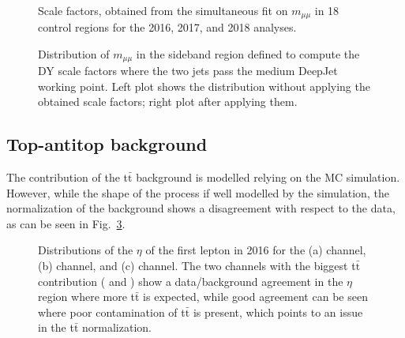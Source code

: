 \documentclass[../main.tex]{subfiles}
\begin{document}
\begin{figure}[h!]
\begin{center}
\\
\end{center}
\caption{Scale factors, obtained from the simultaneous fit on $m_{\mu\mu}$ in 18 control regions for the 2016, 2017, and 2018 analyses.}
\label{hh:fig:dy_sf}
\end{figure}

\begin{figure}[h!]
\begin{center}
\end{center}
\caption{Distribution of $m_{\mu\mu}$ in the sideband region defined to compute the DY scale factors where the two jets pass the medium DeepJet working point. Left plot shows the distribution without applying the obtained scale factors; right plot after applying them.}
\label{hh:fig:dy_sf_datamc}
\end{figure}


\subsection{Top-antitop background}
\label{hh:subs:tt}

The contribution of the t$\bar{\text{t}}$ background is modelled relying on the MC simulation. However, while the shape of the process if well modelled by the simulation, the normalization of the background shows a disagreement with respect to the data, as can be seen in Fig.~\ref{hh:fig:ttbar_disc}.

\begin{figure}[h]
\begin{center}
\end{center}
\caption{Distributions of the $\eta$ of the first lepton in 2016 for the (a) \taumu\tauh{} channel, (b) \taue\tauh{} channel, and (c) \tauh\tauh{} channel. The two channels with the biggest t$\bar{\text{t}}$ contribution (\taumu\tauh{} and \taue\tauh{}) show a data/background agreement in the $\eta$ region where more t$\bar{\text{t}}$ is expected, while good agreement can be seen where poor contamination of t$\bar{\text{t}}$ is present, which points to an issue in the t$\bar{\text{t}}$ normalization.}
\label{hh:fig:ttbar_disc}
\end{figure}
\end{document}
